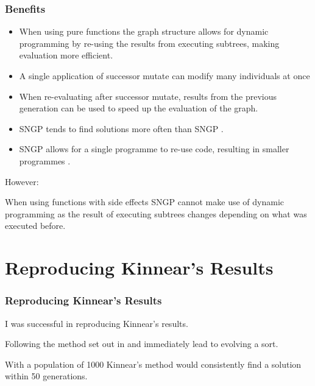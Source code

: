 \documentclass{beamer}
\begin{document}
\begin{frame}
\begin{frame}
	
		\end{frame}
	
		\begin{frame}
		
			\frametitle{Benefits}
					
			\begin{itemize}
				
				\item When using pure functions the graph structure allows for dynamic programming by re-using the results from executing subtrees, making evaluation more efficient.
				\item A single application of successor mutate can modify many individuals at once
				\item When re-evaluating after successor mutate, results from the previous generation can be used to speed up the evaluation of the graph.
				\item SNGP tends to find solutions more often than SNGP \cite{jackson_new_2012, jackson_single_2012}.
				\item SNGP allows for a single programme to re-use code, resulting in smaller programmes \cite{jackson_new_2012}.
				
			\end{itemize}
			
			\pause
			
			However:
			
			When using functions with side effects SNGP cannot make use of dynamic programming as the result of executing subtrees changes depending on what was executed before.

		
		\end{frame}
		
	\section{Reproducing Kinnear's Results}
	
		\begin{frame}
		
			\frametitle{Reproducing Kinnear's Results}
			
			I was successful in reproducing Kinnear's results.
			
			\pause
			
			Following the method set out in \cite{kinnear_generality_1993} and \cite{kinnear_evolving_1993} immediately lead to evolving a sort.
			
			\pause
			
			With a population of 1000 Kinnear's method would consistently find a solution within 50 generations.
			

\end{frame}
\end{frame}
\end{document}
